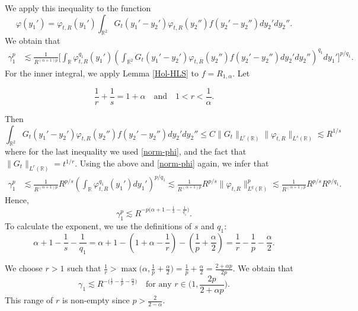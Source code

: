 \documentclass[12pt]{article}
\def\bR{\mathbb{R}}
\newcommand{\les}{\lesssim}
\begin{document}
\begin{itemize}
We apply this inequality to the function
\[
\varphi(y_1')= \varphi_{t,R}(y_1')\int_{\bR^2} G_t(y_1'-y_2') \varphi_{t,R}(y_2'')  f(y_2'-y_2'') dy_2' dy_2''.
\]
We obtain that
\begin{align*}
\gamma_1^p & \les 
 \frac{1}{R^{(\alpha+1)p}} \Bigg[ \int_{\bR} \varphi_{t,R}^{q_1}(y_1') \left( \int_{\bR^2}  G_t(y_1'-y_2') \varphi_{t,R}(y_2'')  f(y_2'-y_2'') dy_2' dy_2'' \right)^{q_1} dy_1' \Bigg]^{p/q_1}.
\end{align*}
For the inner integral, we apply Lemma \ref{Hol-HLS} to $f=R_{1,\alpha}$. Let

\begin{equation}
\label{def-rs}
\frac{1}{r}+\frac{1}{s}=1+\alpha \quad \mbox{and} \quad 1 < r <\frac{1}{\alpha}.
\end{equation}

Then
\[
\int_{\bR^2}  G_t(y_1'-y_2') \varphi_{t,R}(y_2'')  f(y_2'-y_2'') dy_2' dy_2''  \leq C \|G_t\|_{L^r(\bR)}\|\varphi_{t,R}\|_{L^s(\bR)} \les R^{1/s}
\]
where for the last inequality we used \eqref{norm-phi}, and the fact that $\|G_t\|_{L^r(\bR)}=t^{1/r}$.
Using the above and \eqref{norm-phi} again,  we infer that
\begin{align*}
\gamma_1^p & \les \frac{1}{R^{(\alpha+1)p}} R^{p/s} \left( \int_{\bR}\varphi_{t,R}^{q_1}(y_1') dy_1' \right)^{p/q_1} \les \frac{1}{R^{(\alpha+1)p}} R^{p/s}  \|\varphi_{t,R}\|_{L^q(\bR)}^p \les \frac{1}{R^{(\alpha+1)p}} R^{p/s} R^{p/q_1}.
\end{align*}
Hence,
\[
\gamma_1^p \les R^{-p\big(\alpha+1-\frac{1}{s}-\frac{1}{q_1}\big)}.
\]
To calculate the exponent, we use the definitions of $s$ and $q_1$:
\[
\alpha+1-\frac{1}{s}-\frac{1}{q_1}=\alpha+1-\left(1+\alpha-\frac{1}{r} \right)-\left(\frac{1}{p}+\frac{\alpha}{2} \right)=\frac{1}{r}-\frac{1}{p}-\frac{\alpha}{2}.
\]

We  choose $r>1$ such that $\frac{1}{r}>\max\big(\alpha,\frac{1}{p}+\frac{\alpha}{2}\big)=\frac{1}{p}+\frac{\alpha}{2}=\frac{2+\alpha p}{2p}$. We obtain that
\[
\gamma_1 \les R^{-\big(\frac{1}{r}-\frac{1}{p}-\frac{\alpha}{2} \big)} \quad \mbox{for any $r \in \big(1, \frac{2p}{2+\alpha p}\big)$.}
\]
This range of $r$ is non-empty since $p>\frac{2}{2-\alpha}$.


\end{itemize}
\end{document}
